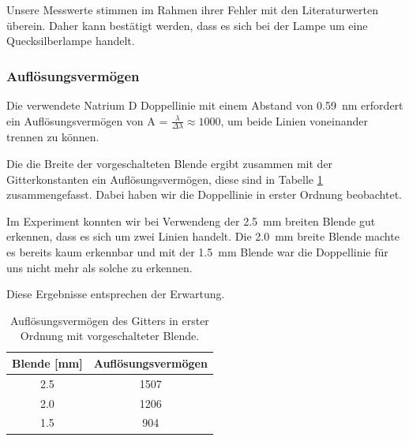 \documentclass[12pt,a4paper]{article}
\begin{document}
	Unsere Messwerte stimmen im Rahmen ihrer Fehler mit den Literaturwerten überein. Daher kann bestätigt werden, dass es sich bei der Lampe um eine Quecksilberlampe handelt.
	
	\subsubsection{Auflösungsvermögen}
	
	Die verwendete Natrium D Doppellinie mit einem Abstand von \SI{0.59}{nm} erfordert ein Auflösungsvermögen von A = $\frac{\lambda}{\Delta\lambda} \approx 1000 $, um beide Linien voneinander trennen zu können.
	
	Die die Breite der vorgeschalteten Blende ergibt zusammen mit der Gitterkonstanten ein Auflösungsvermögen, diese sind in Tabelle \ref{tab:gitter_auflösung} zusammengefasst. Dabei haben wir die Doppellinie in erster Ordnung beobachtet.
	
	Im Experiment konnten wir bei Verwendeng der \SI{2.5}{mm} breiten Blende gut erkennen, dass es sich um zwei Linien handelt. Die \SI{2.0}{mm} breite Blende machte es bereits kaum erkennbar und mit der \SI{1.5}{mm} Blende war die Doppellinie für uns nicht mehr als solche zu erkennen.
	
	Diese Ergebnisse entsprechen der Erwartung.
	
	\begin{table}
		\centering
		\begin{tabular}{|c|c|}
			\hline
			Blende [mm] & Auflösungsvermögen \\
			\hline \hline
			2.5 & 1507 \\
			\hline
			2.0 & 1206 \\
			\hline
			1.5 & 904 \\
			\hline
		\end{tabular}
		\caption{Auflösungsvermögen des Gitters in erster Ordnung mit vorgeschalteter Blende.}
		\label{tab:gitter_auflösung}
	\end{table}
	
\end{document}
